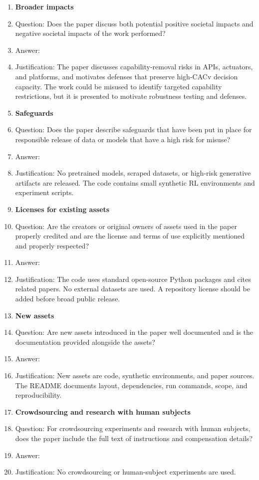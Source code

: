 \begin{enumerate}
\item {\bf Broader impacts}
    \item[] Question: Does the paper discuss both potential positive societal impacts and negative societal impacts of the work performed?
    \item[] Answer: \answerYes{}
    \item[] Justification: The paper discusses capability-removal risks in APIs, actuators, and platforms, and motivates defenses that preserve high-CACv decision capacity. The work could be misused to identify targeted capability restrictions, but it is presented to motivate robustness testing and defenses.

\item {\bf Safeguards}
    \item[] Question: Does the paper describe safeguards that have been put in place for responsible release of data or models that have a high risk for misuse?
    \item[] Answer: \answerNA{}
    \item[] Justification: No pretrained models, scraped datasets, or high-risk generative artifacts are released. The code contains small synthetic RL environments and experiment scripts.

\item {\bf Licenses for existing assets}
    \item[] Question: Are the creators or original owners of assets used in the paper properly credited and are the license and terms of use explicitly mentioned and properly respected?
    \item[] Answer: \answerYes{}
    \item[] Justification: The code uses standard open-source Python packages and cites related papers. No external datasets are used. A repository license should be added before broad public release.

\item {\bf New assets}
    \item[] Question: Are new assets introduced in the paper well documented and is the documentation provided alongside the assets?
    \item[] Answer: \answerYes{}
    \item[] Justification: New assets are code, synthetic environments, and paper sources. The README documents layout, dependencies, run commands, scope, and reproducibility.

\item {\bf Crowdsourcing and research with human subjects}
    \item[] Question: For crowdsourcing experiments and research with human subjects, does the paper include the full text of instructions and compensation details?
    \item[] Answer: \answerNA{}
    \item[] Justification: No crowdsourcing or human-subject experiments are used.


\end{enumerate}
